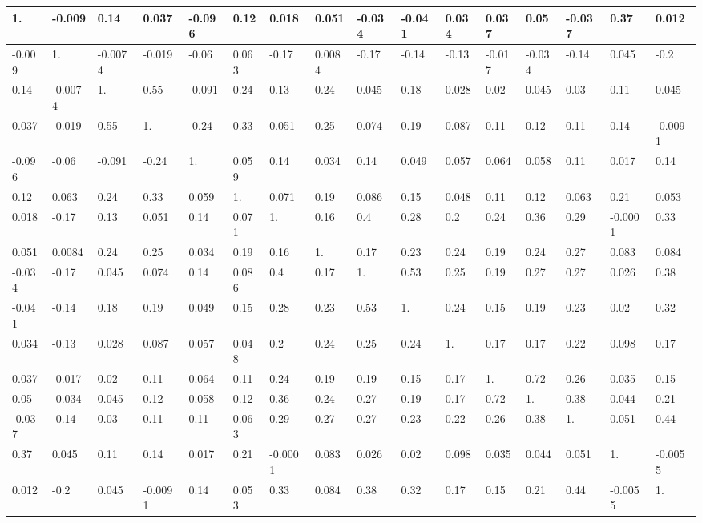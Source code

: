 \documentclass[10pt]{book}
\begin{document}
\begin{center}
\begin{enumerate}
\begin{center}
\begin{center}
\begin{tabular}{|l|l|l|l|l|l|l|l|l|l|l|l|l|l|l|l|}
\hline
1. & -0.009 & 0.14 & 0.037 & -0.096 & 0.12 & 0.018 & 0.051 & -0.034 & -0.041 & 0.034 & 0.037 & 0.05 & -0.037 & 0.37 & 0.012 \\
\hline
-0.009 & 1. & -0.0074 & -0.019 & -0.06 & 0.063 & -0.17 & 0.0084 & -0.17 & -0.14 & -0.13 & -0.017 & -0.034 & -0.14 & 0.045 & -0.2 \\
\hline
0.14 & -0.0074 & 1. & 0.55 & -0.091 & 0.24 & 0.13 & 0.24 & 0.045 & 0.18 & 0.028 & 0.02 & 0.045 & 0.03 & 0.11 & 0.045 \\
\hline
0.037 & -0.019 & 0.55 & 1. & -0.24 & 0.33 & 0.051 & 0.25 & 0.074 & 0.19 & 0.087 & 0.11 & 0.12 & 0.11 & 0.14 & -0.0091 \\
\hline
-0.096 & -0.06 & -0.091 & -0.24 & 1. & 0.059 & 0.14 & 0.034 & 0.14 & 0.049 & 0.057 & 0.064 & 0.058 & 0.11 & 0.017 & 0.14 \\
\hline
0.12 & 0.063 & 0.24 & 0.33 & 0.059 & 1. & 0.071 & 0.19 & 0.086 & 0.15 & 0.048 & 0.11 & 0.12 & 0.063 & 0.21 & 0.053 \\
\hline
0.018 & -0.17 & 0.13 & 0.051 & 0.14 & 0.071 & 1. & 0.16 & 0.4 & 0.28 & 0.2 & 0.24 & 0.36 & 0.29 & -0.0001 & 0.33 \\
\hline
0.051 & 0.0084 & 0.24 & 0.25 & 0.034 & 0.19 & 0.16 & 1. & 0.17 & 0.23 & 0.24 & 0.19 & 0.24 & 0.27 & 0.083 & 0.084 \\
\hline
-0.034 & -0.17 & 0.045 & 0.074 & 0.14 & 0.086 & 0.4 & 0.17 & 1. & 0.53 & 0.25 & 0.19 & 0.27 & 0.27 & 0.026 & 0.38 \\
\hline
-0.041 & -0.14 & 0.18 & 0.19 & 0.049 & 0.15 & 0.28 & 0.23 & 0.53 & 1. & 0.24 & 0.15 & 0.19 & 0.23 & 0.02 & 0.32 \\
\hline
0.034 & -0.13 & 0.028 & 0.087 & 0.057 & 0.048 & 0.2 & 0.24 & 0.25 & 0.24 & 1. & 0.17 & 0.17 & 0.22 & 0.098 & 0.17 \\
\hline
0.037 & -0.017 & 0.02 & 0.11 & 0.064 & 0.11 & 0.24 & 0.19 & 0.19 & 0.15 & 0.17 & 1. & 0.72 & 0.26 & 0.035 & 0.15 \\
\hline
0.05 & -0.034 & 0.045 & 0.12 & 0.058 & 0.12 & 0.36 & 0.24 & 0.27 & 0.19 & 0.17 & 0.72 & 1. & 0.38 & 0.044 & 0.21 \\
\hline
-0.037 & -0.14 & 0.03 & 0.11 & 0.11 & 0.063 & 0.29 & 0.27 & 0.27 & 0.23 & 0.22 & 0.26 & 0.38 & 1. & 0.051 & 0.44 \\
\hline
0.37 & 0.045 & 0.11 & 0.14 & 0.017 & 0.21 & -0.0001 & 0.083 & 0.026 & 0.02 & 0.098 & 0.035 & 0.044 & 0.051 & 1. & -0.0055 \\
\hline
0.012 & -0.2 & 0.045 & -0.0091 & 0.14 & 0.053 & 0.33 & 0.084 & 0.38 & 0.32 & 0.17 & 0.15 & 0.21 & 0.44 & -0.0055 & 1. \\
\hline
\end{tabular}
\end{center}


\end{center}
\end{enumerate}
\end{center}
\end{document}
